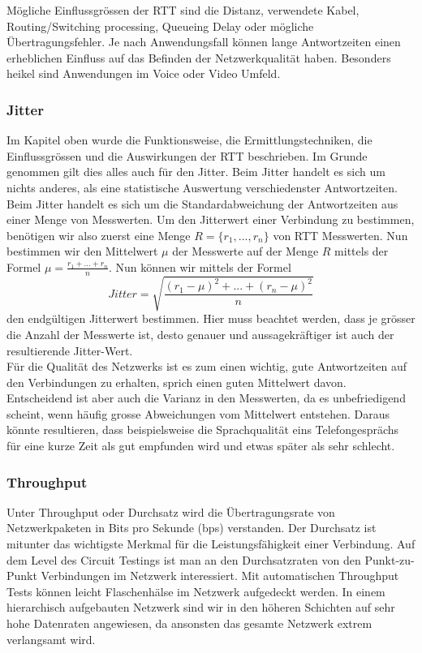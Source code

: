 \documentclass[a4,12pt]{scrartcl}
\begin{document}
\noindent Mögliche Einflussgrössen der RTT sind die Distanz, verwendete Kabel, Routing/Switching processing, Queueing Delay oder mögliche Übertragungsfehler. Je nach Anwendungsfall können lange Antwortzeiten einen erheblichen Einfluss auf das Befinden der Netzwerkqualität haben. Besonders heikel sind Anwendungen im Voice oder Video Umfeld. 
\subsubsection{Jitter}
Im Kapitel oben wurde die Funktionsweise, die Ermittlungstechniken, die Einflussgrössen und die Auswirkungen der RTT beschrieben. Im Grunde genommen gilt dies alles auch für den Jitter. Beim Jitter handelt es sich um nichts anderes, als eine statistische Auswertung verschiedenster Antwortzeiten.\\

\noindent Beim Jitter handelt es sich um die Standardabweichung der Antwortzeiten aus einer Menge von Messwerten. Um den Jitterwert einer Verbindung zu bestimmen, benötigen wir also zuerst eine Menge $R = \{r_1,...,r_n\}$ von RTT Messwerten. Nun bestimmen wir den Mittelwert $\mu$ der Messwerte auf der Menge $R$ mittels der Formel $\mu = \frac{r_1+...+r_n}{n}$. Nun können wir mittels der Formel
\begin{equation}
Jitter = \sqrt{\frac{(r_1-\mu)^2 + ... + (r_n-\mu)^2}{n}}
\end{equation}
den endgültigen Jitterwert bestimmen. Hier muss beachtet werden, dass je grösser die Anzahl der Messwerte ist, desto genauer und aussagekräftiger ist auch der resultierende Jitter-Wert.
\\

\noindent Für die Qualität des Netzwerks ist es zum einen wichtig, gute Antwortzeiten auf den Verbindungen zu erhalten, sprich einen guten Mittelwert davon. Entscheidend ist aber auch die Varianz in den Messwerten, da es unbefriedigend scheint, wenn häufig grosse Abweichungen vom Mittelwert entstehen. Daraus könnte resultieren, dass beispielsweise die Sprachqualität eins Telefongesprächs für eine kurze Zeit als gut empfunden wird und etwas später als sehr schlecht.
\subsubsection{Throughput}
Unter Throughput oder Durchsatz wird die Übertragungsrate von Netzwerkpaketen in Bits pro Sekunde (bps) verstanden. Der Durchsatz ist mitunter das wichtigste Merkmal für die Leistungsfähigkeit einer Verbindung. Auf dem Level des Circuit Testings ist man an den Durchsatzraten von den Punkt-zu-Punkt Verbindungen im Netzwerk interessiert. Mit automatischen Throughput Tests können leicht Flaschenhälse im Netzwerk aufgedeckt werden. In einem hierarchisch aufgebauten Netzwerk sind wir in den höheren Schichten auf sehr hohe Datenraten angewiesen, da ansonsten das gesamte Netzwerk extrem verlangsamt wird.\\
\end{document}
